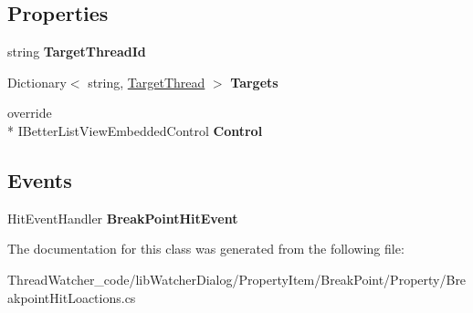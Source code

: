 \subsection*{Properties}
\begin{DoxyCompactItemize}
\item 
\hypertarget{classlib_watcher_dialog_1_1_property_item_1_1_break_point_1_1_property_1_1_breakpoint_hit_loactions_a2ec46f6ee6a0834b42bc31b9dc4ac185}{string {\bfseries Target\+Thread\+Id}}\label{classlib_watcher_dialog_1_1_property_item_1_1_break_point_1_1_property_1_1_breakpoint_hit_loactions_a2ec46f6ee6a0834b42bc31b9dc4ac185}

\item 
\hypertarget{classlib_watcher_dialog_1_1_property_item_1_1_break_point_1_1_property_1_1_breakpoint_hit_loactions_a827ddbdeb020bc584163de5dc141cf0d}{Dictionary$<$ string, \hyperlink{classlib_watcher_dialog_1_1_property_item_1_1_break_point_1_1_target_thread}{Target\+Thread} $>$ {\bfseries Targets}}\label{classlib_watcher_dialog_1_1_property_item_1_1_break_point_1_1_property_1_1_breakpoint_hit_loactions_a827ddbdeb020bc584163de5dc141cf0d}

\item 
\hypertarget{classlib_watcher_dialog_1_1_property_item_1_1_break_point_1_1_property_1_1_breakpoint_hit_loactions_a1239218397e04a8bf9efc76fbd4e7a32}{override \\*
I\+Better\+List\+View\+Embedded\+Control {\bfseries Control}}\label{classlib_watcher_dialog_1_1_property_item_1_1_break_point_1_1_property_1_1_breakpoint_hit_loactions_a1239218397e04a8bf9efc76fbd4e7a32}

\end{DoxyCompactItemize}
\subsection*{Events}
\begin{DoxyCompactItemize}
\item 
\hypertarget{classlib_watcher_dialog_1_1_property_item_1_1_break_point_1_1_property_1_1_breakpoint_hit_loactions_abcead58547e63663b8f85179906e394f}{Hit\+Event\+Handler {\bfseries Break\+Point\+Hit\+Event}}\label{classlib_watcher_dialog_1_1_property_item_1_1_break_point_1_1_property_1_1_breakpoint_hit_loactions_abcead58547e63663b8f85179906e394f}

\end{DoxyCompactItemize}


The documentation for this class was generated from the following file\+:\begin{DoxyCompactItemize}
\item 
Thread\+Watcher\+\_\+code/lib\+Watcher\+Dialog/\+Property\+Item/\+Break\+Point/\+Property/Breakpoint\+Hit\+Loactions.\+cs\end{DoxyCompactItemize}
